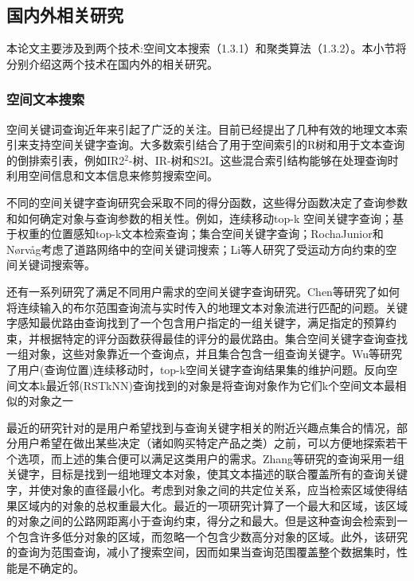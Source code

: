 \subsection{国内外相关研究}
本论文主要涉及到两个技术:空间文本搜索（1.3.1）和聚类算法（1.3.2）。本小节将分别介绍这两个技术在国内外的相关研究。


\subsubsection{空间文本搜索}
空间关键词查询近年来引起了广泛的关注。目前已经提出了几种有效的地理文本索引来支持空间关键字查询。大多数索引结合了用于空间索引的R树和用于文本查询的倒排索引表，例如IR2$^2$-树\cite{DBLP:conf/icde/FelipeHR08}、IR-树\cite{DBLP:journals/vldb/WuCJ12}和S2I\cite{DBLP:conf/ssd/RochaGJN11}。这些混合索引结构能够在处理查询时利用空间信息和文本信息来修剪搜索空间。

不同的空间关键字查询研究会采取不同的得分函数，这些得分函数决定了查询参数和如何确定对象与查询参数的相关性。例如，连续移动top-k 空间关键字查询\cite{DBLP:journals/tods/WuYJ13, DBLP:conf/icde/WuYJC11}；基于权重的位置感知top-k文本检索查询\cite{DBLP:journals/pvldb/CaoCJ10}；集合空间关键字查询\cite{DBLP:conf/sigmod/CaoCJO11}；RochaJunior和Nørvåg\cite{DBLP:conf/edbt/Rocha-JuniorN12}考虑了道路网络中的空间关键词搜索；Li等人\cite{DBLP:conf/icde/LiFX12}研究了受运动方向约束的空间关键词搜索等。

还有一系列研究了满足不同用户需求的空间关键字查询研究。Chen等\cite{DBLP:conf/sigmod/ChenCC13}研究了如何将连续输入的布尔范围查询流与实时传入的地理文本对象流进行匹配的问题。关键字感知最优路由查询\cite{DBLP:journals/pvldb/CaoCCX12}找到了一个包含用户指定的一组关键字，满足指定的预算约束，并根据特定的评分函数获得最佳的评分的最优路由。集合空间关键字查询\cite{DBLP:journals/tods/CaoCGJO15,DBLP:conf/sigmod/CaoCJO11,DBLP:conf/sigmod/LongWWF13}查找一组对象，这些对象靠近一个查询点，并且集合包含一组查询关键字。Wu等\cite{DBLP:journals/tods/WuYJ13 ,DBLP:conf/icde/WuYJC11}研究了用户(查询位置)连续移动时，top-k空间关键字查询结果集的维护问题。反向空间文本k最近邻(RSTkNN)查询\cite{DBLP:conf/sigmod/LuLC11}找到的对象是将查询对象作为它们k个空间文本最相似的对象之一

最近的研究\cite{DBLP:journals/pvldb/BoghSJ13,DBLP:journals/vldb/SkovsgaardJ15}针对的是用户希望找到与查询关键字相关的附近兴趣点集合的情况，部分用户希望在做出某些决定（诸如购买特定产品之类）之前，可以方便地探索若干个选项，而上述的集合便可以满足这类用户的需求。Zhang等\cite{DBLP:conf/icde/ZhangOT10, DBLP:conf/icde/ZhangCMTK09}研究的查询采用一组关键字，目标是找到一组地理文本对象，使其文本描述的联合覆盖所有的查询关键字，并使对象的直径最小化。考虑到对象之间的共定位关系，应当检索区域使得结果区域内的对象的总权重最大化\cite{DBLP:journals/pvldb/ChoiCT12,DBLP:conf/cikm/LiuYS11,DBLP:journals/pvldb/TaoHCC13}。最近的一项研究\cite{DBLP:journals/pvldb/CaoCJY14}计算了一个最大和区域，该区域的对象之间的公路网距离小于查询约束，得分之和最大。但是这种查询会检索到一个包含许多低分对象的区域，而忽略一个包含少数高分对象的区域。此外，该研究的查询为范围查询，减小了搜索空间，因而如果当查询范围覆盖整个数据集时，性能是不确定的。

